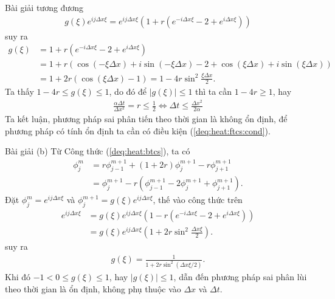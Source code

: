 \documentclass[9pt]{beamer}
\numberwithin{equation}{section}
\begin{document}
\begin{frame}
\begin{exampleblock}{Bài giải}
    tương đương
    \begin{align*}
        g(\xi) e^{ij\Delta x \xi} = e^{ij\Delta x \xi} \left(1 + r\left( e^{-i\Delta x \xi} - 2 + e^{i\Delta x \xi} \right)\right)
    \end{align*}
    suy ra
    \begin{align*}
        g(\xi) &= 1 + r\left( e^{-i\Delta x \xi} - 2 + e^{i\Delta x \xi} \right) \\
        &= 1 + r\left( \cos(-\xi \Delta x) + i \sin(-\xi \Delta x) - 2 + \cos(\xi \Delta x) + i \sin(\xi \Delta x) \right) \\
        &= 1 + 2r\left(\cos(\xi \Delta x) - 1\right)
        = 1 - 4r\sin^2 \frac{\xi \Delta x}{2}.
    \end{align*}
    Ta thấy $1-4r \le g(\xi) \le 1$, do đó để $|g(\xi)| \le 1$ thì ta cần $1-4r \ge 1$, hay
    \begin{align}
        \frac{\alpha \Delta t}{\Delta x^2} = r \le \frac{1}{2} \Leftrightarrow
        \Delta t \le \frac{\Delta x^2}{2\alpha} \label{deq:heat:ftcs:cond}
    \end{align}
    Ta kết luận, phương pháp sai phân tiến theo thời gian là không ổn định, để phương pháp có tính ổn định ta cần có điều kiện (\ref{deq:heat:ftcs:cond}).
\end{exampleblock}
\end{frame}

\begin{frame}
\begin{exampleblock}{Bài giải}
    (b) Từ Công thức (\ref{deq:heat:btcs}), ta có
    \begin{align*}
        \phi_j^m &= r\phi_{j-1}^{m+1} + (1+2r)\phi_j^{m+1} - r\phi_{j+1}^{m+1} \\
        &= \phi_j^{m+1} - r\left( \phi_{j-1}^{m+1} - 2\phi_j^{m+1} + \phi_{j+1}^{m+1} \right).
    \end{align*}
    Đặt $\phi_j^m = e^{ij\Delta x \xi}$ và $\phi_j^{m+1} = g(\xi) e^{ij\Delta x \xi}$, thế vào công thức trên
    \begin{align*}
        e^{ij\Delta x \xi}
        &= g(\xi)e^{ij\Delta x \xi}\left(1 - r\left(e^{-i\Delta x\xi} - 2 + e^{i\Delta x\xi}\right)\right) \\
        &= g(\xi)e^{ij\Delta x \xi}\left(1 + 2r\sin^2 \frac{\Delta x\xi}{2}\right).
    \end{align*}
    suy ra
    \begin{align*}
        g(\xi) = \frac{1}{1 + 2r\sin^2 (\Delta x\xi / 2)}.
    \end{align*}
    Khi đó $-1 < 0 \le g(\xi) \le 1$, hay $|g(\xi)| \le 1$, dẫn đến phương pháp sai phân lùi theo thời gian là ổn định, không phụ thuộc vào $\Delta x$ và $\Delta t$.
\end{exampleblock}
\end{frame}
\end{document}
